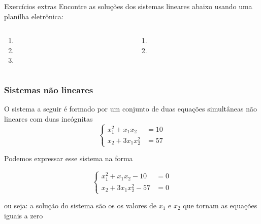 \begin{frame}{Exercícios extras}
Encontre as soluções dos sistemas lineares abaixo usando uma planilha eletrônica:

\begin{columns}
    \begin{column}{0.45\textwidth}
        \begin{enumerate}
            \item {} 
            \item {}
            \item {}
        \end{enumerate}
    \end{column}
    
    \begin{column}{0.45\textwidth}
        \begin{enumerate}\addtocounter{enumi}{3}
            \item {}
            \item {}
        \end{enumerate}    
    \end{column}
\end{columns}

\end{frame}

\begin{frame}
\frametitle{Sistemas não lineares}

O sistema a seguir é formado por um conjunto de duas equações simultâneas não lineares com duas incógnitas
\[
\begin{cases}
x_1^2 + x_1x_2 &= 10 \\
x_2 + 3x_1x_2^2 &= 57
\end{cases}
\]

Podemos expressar esse sistema na forma

\[
\begin{cases}
x_1^2 + x_1x_2 -10 &= 0 \\
x_2 + 3x_1x_2^2 -57 &= 0
\end{cases}
\]

ou seja: a solução do sistema são os os valores de $x_1$ e $x_2$ que tornam as equações iguais a zero
\end{frame}

